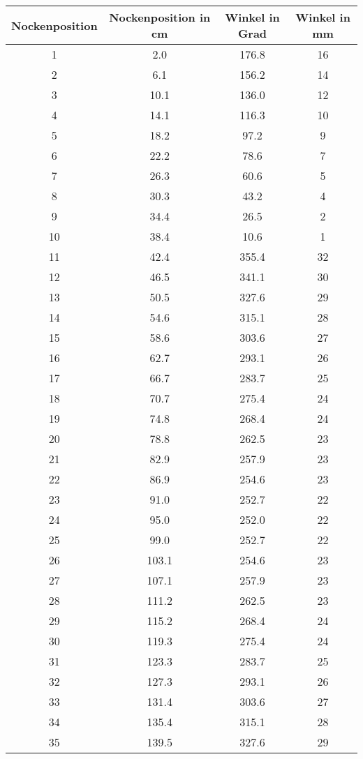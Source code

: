 \documentclass[10pt, a4paper]{article}
\begin{document}
\begin{center}
	\begin{tabular}{c|c|c|c}
		Nockenposition & Nockenposition in cm & Winkel in Grad & Winkel in mm \\
		\hline
		1 & 2.0 & 176.8 & 16 \\
		2 & 6.1 & 156.2 & 14 \\
		3 & 10.1 & 136.0 & 12 \\
		4 & 14.1 & 116.3 & 10 \\
		5 & 18.2 & 97.2 & 9 \\
		6 & 22.2 & 78.6 & 7 \\
		7 & 26.3 & 60.6 & 5 \\
		8 & 30.3 & 43.2 & 4 \\
		9 & 34.4 & 26.5 & 2 \\
		10 & 38.4 & 10.6 & 1 \\
		11 & 42.4 & 355.4 & 32 \\
		12 & 46.5 & 341.1 & 30 \\
		13 & 50.5 & 327.6 & 29 \\
		14 & 54.6 & 315.1 & 28 \\
		15 & 58.6 & 303.6 & 27 \\
		16 & 62.7 & 293.1 & 26 \\
		17 & 66.7 & 283.7 & 25 \\
		18 & 70.7 & 275.4 & 24 \\
		19 & 74.8 & 268.4 & 24 \\
		20 & 78.8 & 262.5 & 23 \\
		21 & 82.9 & 257.9 & 23 \\
		22 & 86.9 & 254.6 & 23 \\
		23 & 91.0 & 252.7 & 22 \\
		24 & 95.0 & 252.0 & 22 \\
		25 & 99.0 & 252.7 & 22 \\
		26 & 103.1 & 254.6 & 23 \\
		27 & 107.1 & 257.9 & 23 \\
		28 & 111.2 & 262.5 & 23 \\
		29 & 115.2 & 268.4 & 24 \\
		30 & 119.3 & 275.4 & 24 \\
		31 & 123.3 & 283.7 & 25 \\
		32 & 127.3 & 293.1 & 26 \\
		33 & 131.4 & 303.6 & 27 \\
		34 & 135.4 & 315.1 & 28 \\
		35 & 139.5 & 327.6 & 29 \\

\end{tabular}
\end{center}
\end{document}
